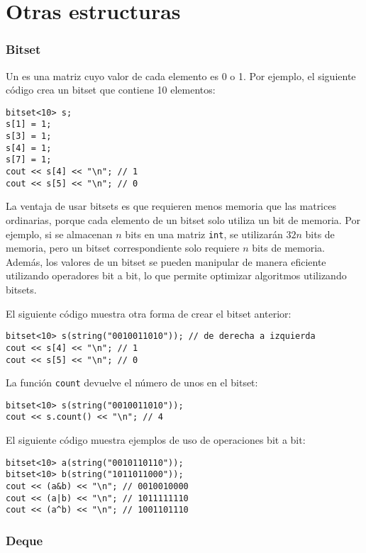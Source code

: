\section{Otras estructuras}

\subsubsection{Bitset}


Un  es una matriz
cuyo valor de cada elemento es 0 o 1.
Por ejemplo, el siguiente código crea
un bitset que contiene 10 elementos:
\begin{lstlisting}
bitset<10> s;
s[1] = 1;
s[3] = 1;
s[4] = 1;
s[7] = 1;
cout << s[4] << "\n"; // 1
cout << s[5] << "\n"; // 0
\end{lstlisting}

La ventaja de usar bitsets es que
requieren menos memoria que las matrices ordinarias,
porque cada elemento de un bitset solo
utiliza un bit de memoria.
Por ejemplo, 
si se almacenan $n$ bits en una matriz \texttt{int},
se utilizarán $32n$ bits de memoria,
pero un bitset correspondiente solo requiere $n$ bits de memoria.
Además, los valores de un bitset
se pueden manipular de manera eficiente utilizando
operadores bit a bit, lo que permite
optimizar algoritmos utilizando bitsets.

El siguiente código muestra otra forma de crear el bitset anterior:
\begin{lstlisting}
bitset<10> s(string("0010011010")); // de derecha a izquierda
cout << s[4] << "\n"; // 1
cout << s[5] << "\n"; // 0
\end{lstlisting}

La función \texttt{count} devuelve el número
de unos en el bitset:

\begin{lstlisting}
bitset<10> s(string("0010011010"));
cout << s.count() << "\n"; // 4
\end{lstlisting}

El siguiente código muestra ejemplos de uso de operaciones bit a bit:
\begin{lstlisting}
bitset<10> a(string("0010110110"));
bitset<10> b(string("1011011000"));
cout << (a&b) << "\n"; // 0010010000
cout << (a|b) << "\n"; // 1011111110
cout << (a^b) << "\n"; // 1001101110
\end{lstlisting}

\subsubsection{Deque}

